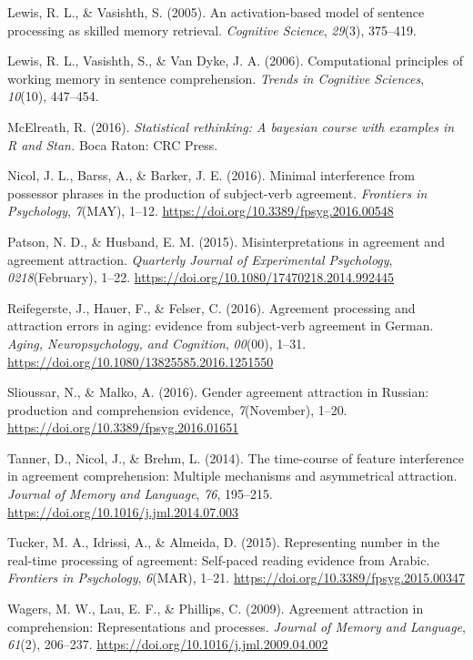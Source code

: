 \documentclass[english,doc]{apa6}
\begin{document}
\leavevmode\hypertarget{ref-Lewis2005}{}%
Lewis, R. L., \& Vasishth, S. (2005). An activation-based model of sentence processing as skilled memory retrieval. \emph{Cognitive Science}, \emph{29}(3), 375--419.

\leavevmode\hypertarget{ref-Lewis2006}{}%
Lewis, R. L., Vasishth, S., \& Van Dyke, J. A. (2006). Computational principles of working memory in sentence comprehension. \emph{Trends in Cognitive Sciences}, \emph{10}(10), 447--454.

\leavevmode\hypertarget{ref-McElreath:2016}{}%
McElreath, R. (2016). \emph{Statistical rethinking: A bayesian course with examples in R and Stan.} Boca Raton: CRC Press.

\leavevmode\hypertarget{ref-NicolEtAl:2016}{}%
Nicol, J. L., Barss, A., \& Barker, J. E. (2016). Minimal interference from possessor phrases in the production of subject-verb agreement. \emph{Frontiers in Psychology}, \emph{7}(MAY), 1--12. \url{https://doi.org/10.3389/fpsyg.2016.00548}

\leavevmode\hypertarget{ref-PatsonHusband:2015}{}%
Patson, N. D., \& Husband, E. M. (2015). Misinterpretations in agreement and agreement attraction. \emph{Quarterly Journal of Experimental Psychology}, \emph{0218}(February), 1--22. \url{https://doi.org/10.1080/17470218.2014.992445}

\leavevmode\hypertarget{ref-ReifegersteEtAl:2016}{}%
Reifegerste, J., Hauer, F., \& Felser, C. (2016). Agreement processing and attraction errors in aging: evidence from subject-verb agreement in German. \emph{Aging, Neuropsychology, and Cognition}, \emph{00}(00), 1--31. \url{https://doi.org/10.1080/13825585.2016.1251550}

\leavevmode\hypertarget{ref-SlioussarMalko:2016}{}%
Slioussar, N., \& Malko, A. (2016). Gender agreement attraction in Russian: production and comprehension evidence, \emph{7}(November), 1--20. \url{https://doi.org/10.3389/fpsyg.2016.01651}

\leavevmode\hypertarget{ref-TannerEtAl:2014}{}%
Tanner, D., Nicol, J., \& Brehm, L. (2014). The time-course of feature interference in agreement comprehension: Multiple mechanisms and asymmetrical attraction. \emph{Journal of Memory and Language}, \emph{76}, 195--215. \url{https://doi.org/10.1016/j.jml.2014.07.003}

\leavevmode\hypertarget{ref-TuckerEtAl:2015}{}%
Tucker, M. A., Idrissi, A., \& Almeida, D. (2015). Representing number in the real-time processing of agreement: Self-paced reading evidence from Arabic. \emph{Frontiers in Psychology}, \emph{6}(MAR), 1--21. \url{https://doi.org/10.3389/fpsyg.2015.00347}

\leavevmode\hypertarget{ref-WagersEtAl:2009}{}%
Wagers, M. W., Lau, E. F., \& Phillips, C. (2009). Agreement attraction in comprehension: Representations and processes. \emph{Journal of Memory and Language}, \emph{61}(2), 206--237. \url{https://doi.org/10.1016/j.jml.2009.04.002}
\end{document}
